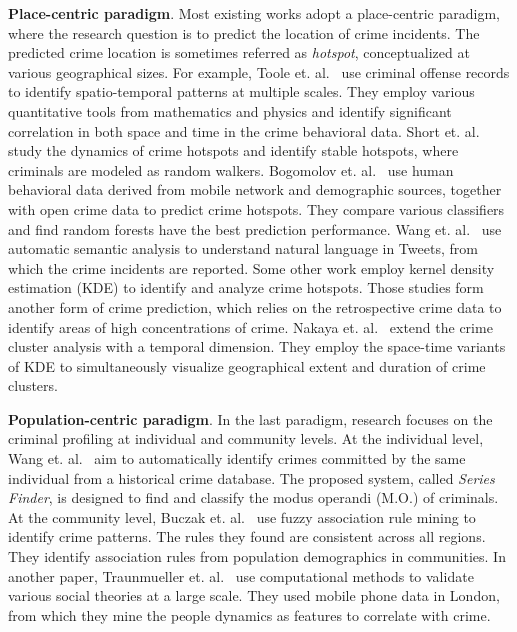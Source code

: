 \smallskip
\textbf{Place-centric paradigm}. Most existing works adopt a place-centric paradigm, where the research question is to predict the location of crime incidents.  The predicted crime location is sometimes referred as \emph{hotspot}, conceptualized at various geographical sizes. For example, Toole et. al.~\cite{TEP11} use criminal offense records to identify spatio-temporal patterns at multiple scales. They employ various quantitative tools from mathematics and physics and identify significant correlation in both space and time in the crime behavioral data. Short et. al.~\cite{SDPT+08} study the dynamics of crime hotspots and identify stable hotspots, where criminals are modeled as random walkers. Bogomolov et. al.~\cite{Bogo14} use human behavioral data derived from mobile network and demographic sources, together with open crime data to predict crime hotspots. They compare various classifiers and find random forests have the best prediction performance. Wang et. al.~\cite{WGB12} use automatic semantic analysis to understand natural language in Tweets, from which the crime incidents are reported. Some other work \cite{CTU08,ECCW05} employ kernel density estimation (KDE) to identify and analyze crime hotspots. Those studies form another form of crime prediction, which relies on the retrospective crime data to identify areas of high concentrations of crime. Nakaya et. al.~\cite{NaYa14} extend the crime cluster analysis with a temporal dimension. They employ the space-time variants of KDE to simultaneously visualize geographical extent and duration of crime clusters. 

\smallskip
\textbf{Population-centric paradigm}. In the last paradigm, research focuses on the criminal profiling at individual and community levels. At the individual level, Wang et. al.~\cite{WRWS13} aim to automatically  identify crimes committed by the same individual from a historical crime database. The proposed system, called \emph{Series Finder}, is designed to find and classify the modus operandi (M.O.) of criminals.  At the community level, Buczak et. al.~\cite{BuGi10} use fuzzy association rule mining to identify crime patterns. The rules they found are consistent across all regions. They identify association rules from population demographics in communities.  In another paper, Traunmueller et. al.~\cite{TQC14} use computational methods to validate various social theories at a large scale.  They used mobile phone data in London, from which they mine the  people dynamics as features to correlate with crime.  

